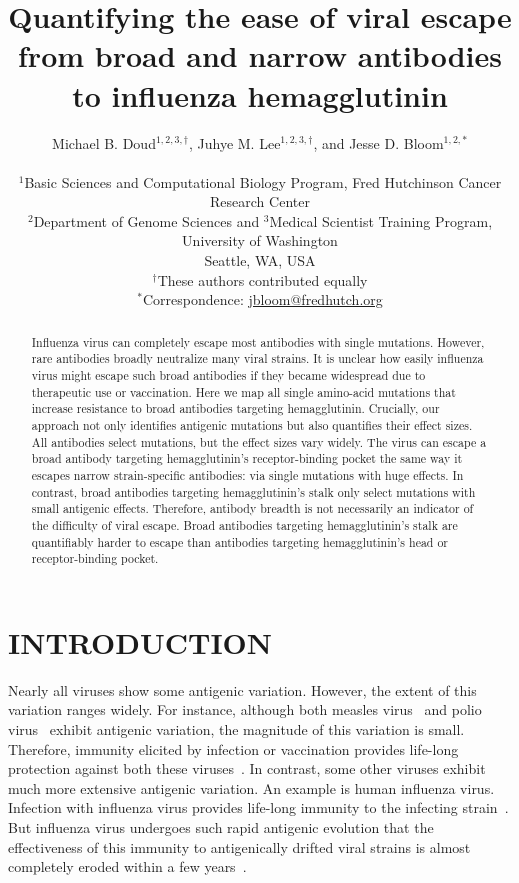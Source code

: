 \documentclass[11pt]{article}
\title{Quantifying the ease of viral escape from broad and narrow antibodies to influenza hemagglutinin}
\author
{Michael B. Doud$^{1,2,3,\dagger}$, Juhye M. Lee$^{1,2,3,\dagger}$, and Jesse D. Bloom$^{1,2,*}$\\
\\
\scriptsize{$^1$Basic Sciences and Computational Biology Program, Fred Hutchinson Cancer Research Center}\\
\scriptsize{$^2$Department of Genome Sciences and $^3$Medical Scientist Training Program, University of Washington} \\
\scriptsize{Seattle, WA, USA} \\
\scriptsize{$^{\dagger}$These authors contributed equally} \\
\scriptsize{$^*$Correspondence: \href{jbloom@fredhutch.org}{jbloom@fredhutch.org}}
}
\date{}
\begin{document}
\maketitle
\onehalfspacing

\begin{abstract}
Influenza virus can completely escape most antibodies with single mutations.
However, rare antibodies broadly neutralize many viral strains.
It is unclear how easily influenza virus might escape such broad antibodies if they became widespread due to therapeutic use or vaccination.
Here we map all single amino-acid mutations that increase resistance to broad antibodies targeting hemagglutinin.
Crucially, our approach not only identifies antigenic mutations but also quantifies their effect sizes.
All antibodies select mutations, but the effect sizes vary widely. 
The virus can escape a broad antibody targeting hemagglutinin's receptor-binding pocket the same way it escapes narrow strain-specific antibodies: via single mutations with huge effects.   
In contrast, broad antibodies targeting hemagglutinin's stalk only select mutations with small antigenic effects. 
Therefore, antibody breadth is not necessarily an indicator of the difficulty of viral escape.
Broad antibodies targeting hemagglutinin's stalk are quantifiably harder to escape than antibodies targeting hemagglutinin's head or receptor-binding pocket.
\end{abstract}

\section*{INTRODUCTION}
Nearly all viruses show some antigenic variation.
However, the extent of this variation ranges widely.
For instance, although both measles virus~\citep{birrer1981antigenic,ter1981antigenic} and polio virus~\citep{crainic1983natural,diamond1985antigenic,drexler2014robustness} exhibit antigenic variation, the magnitude of this variation is small. 
Therefore, immunity elicited by infection or vaccination provides life-long protection against both these viruses~\citep{?}.
In contrast, some other viruses exhibit much more extensive antigenic variation.
An example is human influenza virus.
Infection with influenza virus provides life-long immunity to the infecting strain~\citep{?}.
But influenza virus undergoes such rapid antigenic evolution that the effectiveness of this immunity to antigenically drifted viral strains is almost completely eroded within a few years~\citep{?}. 
\end{document}

